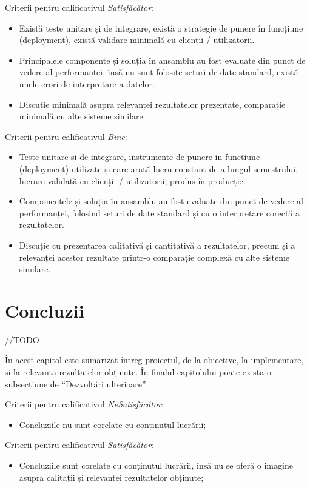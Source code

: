 \documentclass[12pt,a4paper]{report}
\newcommand{\worktype}[1]{[\textit{#1}] }
\newcommand{\dezvoltare}{\worktype{Dezvoltare de produs}}
\newcommand{\cercetare}{\worktype{Cercetare}}
\newcommand{\ambele}{\worktype{Ambele}}
\begin{document}
Criterii pentru calificativul \textit{Satisfăcător}:
\begin{itemize}
	\item \dezvoltare  Există teste unitare și de integrare, există o strategie de punere în funcțiune (deployment), există validare minimală cu clienții / utilizatorii.
	\item \cercetare Principalele componente și soluția în ansamblu au fost evaluate din punct de vedere al performanței, însă nu sunt folosite seturi de date standard, există unele erori de interpretare a datelor.
	\item \ambele Discuție minimală asupra relevanței rezultatelor prezentate, comparație minimală cu alte sisteme similare.
\end{itemize}

Criterii pentru calificativul \textit{Bine}:
\begin{itemize}
	\item \dezvoltare Teste unitare și de integrare, instrumente de punere in funcțiune (deployment) utilizate și care arată lucru constant de-a lungul semestrului, lucrare validată cu clienții / utilizatorii, produs în producție.
	\item \cercetare Componentele și soluția în ansamblu au fost evaluate din punct de vedere al performanței, folosind seturi de date standard și cu o interpretare corectă a rezultatelor.
	\item \ambele Discuție cu prezentarea calitativă și cantitativă a rezultatelor, precum și a relevanței acestor rezultate printr-o comparație complexă cu alte sisteme similare.
\end{itemize}

\chapter{Concluzii}

//TODO

În acest capitol este sumarizat întreg proiectul, de la obiective, la implementare, si la relevanta rezultatelor obținute. În finalul capitolului poate exista o subsecțiune de ``Dezvoltări ulterioare''.

Criterii pentru calificativul \textit{Ne\textit{Satisfăcător}}:
\begin{itemize}
	\item	Concluziile nu sunt corelate cu conținutul lucrării;
\end{itemize}

Criterii pentru calificativul \textit{Satisfăcător}:
\begin{itemize}
	\item	Concluziile sunt corelate cu conținutul lucrării, însă nu se oferă o imagine asupra calității și relevantei rezultatelor obținute;
\end{itemize}
\end{document}
